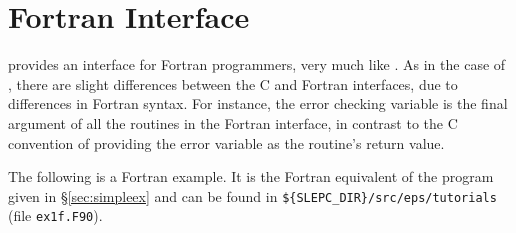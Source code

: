 \section{Fortran Interface}
\label{sec:fortran}

\slepc provides an interface for Fortran programmers, very much like \petsc. As in the case of \petsc, there are slight differences between the C and Fortran \slepc interfaces, due to differences in Fortran syntax. For instance, the error checking variable is the final argument of all the routines in the Fortran interface, in contrast to the C convention of providing the error variable as the routine's return value.

The following is a Fortran example. It is the Fortran equivalent of the program given in \S\ref{sec:simpleex} and can be found in \Verb!${SLEPC_DIR}/src/eps/tutorials! (file \texttt{ex1f.F90}).

%
%
%

